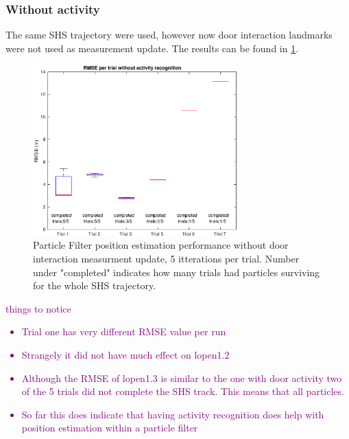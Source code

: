 \subsubsection{Without activity}
The same SHS trajectory were used, however now door interaction landmarks were not used as measurement update. The results can be found in \cref{fig:pf_boxplot_no_doors}.

\begin{figure}[H]
	\centering
	\includegraphics[width=0.7\textwidth]{images/20201116_1333_RMSE_per_trial_without_activity_recognition}
	\caption[Particle Filter position estimation performance without door interaction]{Particle Filter position estimation performance without door interaction measurment update, 5 itterations per trial. Number under "completed" indicates how many trials had particles surviving for the whole SHS trajectory.}
	\label{fig:pf_boxplot_no_doors}
\end{figure}

\textcolor{purple}{
	things to notice
	\begin{itemize}
		\item Trial one has very different RMSE value per run
		\item Strangely it did not have much effect on lopen1.2
		\item Although the RMSE of lopen1.3 is similar to the one with door activity two of the 5 trials did not complete the SHS track. This means that all particles.
		\item So far this does indicate that having activity recognition does help with position estimation within a particle filter
\end{itemize}}


